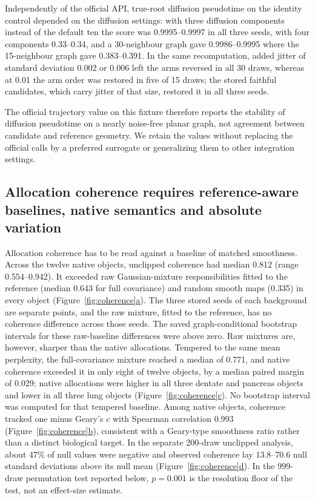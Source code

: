 \documentclass[11pt]{article}
\newcommand{\figpanel}[2]{Figure~\hyperref[#1]{\ref*{#1}#2}}
\begin{document}
Independently of the official API, true-root diffusion pseudotime on the identity control depended on the diffusion settings: with three diffusion components instead of the default ten the score was 0.9995--0.9997 in all three seeds, with four components 0.33--0.34, and a 30-neighbour graph gave 0.9986--0.9995 where the 15-neighbour graph gave 0.383--0.391. In the same recomputation, added jitter of standard deviation 0.002 or 0.006 left the arms reversed in all 30 draws, whereas at 0.01 the arm order was restored in five of 15 draws; the stored faithful candidates, which carry jitter of that size, restored it in all three seeds.

The official trajectory value on this fixture therefore reports the stability of diffusion pseudotime on a nearly noise-free planar graph, not agreement between candidate and reference geometry. We retain the values without replacing the official calls by a preferred surrogate or generalizing them to other integration settings.

\subsection{Allocation coherence requires reference-aware baselines, native semantics and absolute variation}

Allocation coherence has to be read against a baseline of matched smoothness. Across the twelve native objects, unclipped coherence had median 0.812 (range 0.554--0.942). It exceeded raw Gaussian-mixture responsibilities fitted to the reference (median 0.643 for full covariance) and random smooth maps (0.335) in every object (\figpanel{fig:coherence}{a}). The three stored seeds of each background are separate points, and the raw mixture, fitted to the reference, has no coherence difference across those seeds. The saved graph-conditional bootstrap intervals for these raw-baseline differences were above zero. Raw mixtures are, however, sharper than the native allocations. Tempered to the same mean perplexity, the full-covariance mixture reached a median of 0.771, and native coherence exceeded it in only eight of twelve objects, by a median paired margin of 0.029; native allocations were higher in all three dentate and pancreas objects and lower in all three lung objects (\figpanel{fig:coherence}{c}). No bootstrap interval was computed for that tempered baseline. Among native objects, coherence tracked one minus Geary's $c$ with Spearman correlation 0.993 (\figpanel{fig:coherence}{b}), consistent with a Geary-type smoothness ratio rather than a distinct biological target. In the separate 200-draw unclipped analysis, about 47\% of null values were negative and observed coherence lay 13.8--70.6 null standard deviations above its null mean (\figpanel{fig:coherence}{d}). In the 999-draw permutation test reported below, $p=0.001$ is the resolution floor of the test, not an effect-size estimate.
\end{document}
